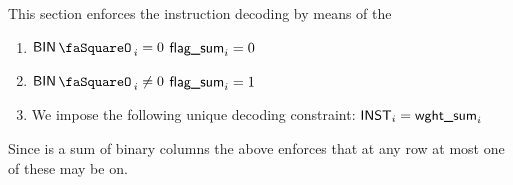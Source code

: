 This section enforces the instruction decoding by means of the 
\begin{enumerate}
	\item \If $\binStamp_{i} =    0$ \Then $\textsf{flag\_sum}_{i} = 0$
	\item \If $\binStamp_{i} \neq 0$ \Then $\textsf{flag\_sum}_{i} = 1$
	\item We impose the following unique decoding constraint: $\textsf{INST}_{i} = \textsf{wght\_sum}_{i}$
\end{enumerate}
\saNote{} Since \locFlagSum{} is a sum of binary columns the above enforces that at any row at most one of these may be on. 
